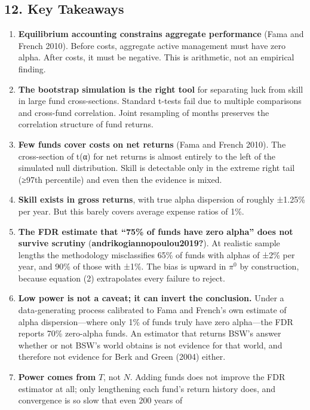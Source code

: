 \documentclass[
  letterpaper,
  DIV=11,
  numbers=noendperiod]{scrartcl}
\begin{document}
\subsection{12. Key Takeaways}\label{key-takeaways}

\begin{enumerate}
\def\labelenumi{\arabic{enumi}.}
\item
  \textbf{Equilibrium accounting constrains aggregate performance} (Fama
  and French 2010). Before costs, aggregate active management must have
  zero alpha. After costs, it must be negative. This is arithmetic, not
  an empirical finding.
\item
  \textbf{The bootstrap simulation is the right tool} for separating
  luck from skill in large fund cross-sections. Standard t-tests fail
  due to multiple comparisons and cross-fund correlation. Joint
  resampling of months preserves the correlation structure of fund
  returns.
\item
  \textbf{Few funds cover costs on net returns} (Fama and French 2010).
  The cross-section of t(α) for net returns is almost entirely to the
  left of the simulated null distribution. Skill is detectable only in
  the extreme right tail (≥97th percentile) and even then the evidence
  is mixed.
\item
  \textbf{Skill exists in gross returns}, with true alpha dispersion of
  roughly ±1.25\% per year. But this barely covers average expense
  ratios of 1\%.
\item
  \textbf{The FDR estimate that ``75\% of funds have zero alpha'' does
  not survive scrutiny} (\textbf{andrikogiannopoulou2019?}). At
  realistic sample lengths the methodology misclassifies 65\% of funds
  with alphas of ±2\% per year, and 90\% of those with ±1\%. The bias is
  upward in \(\pi^0\) by construction, because equation (2) extrapolates
  every failure to reject.
\item
  \textbf{Low power is not a caveat; it can invert the conclusion.}
  Under a data-generating process calibrated to Fama and French's own
  estimate of alpha dispersion---where only 1\% of funds truly have zero
  alpha---the FDR reports 70\% zero-alpha funds. An estimator that
  returns BSW's answer whether or not BSW's world obtains is not
  evidence for that world, and therefore not evidence for Berk and Green
  (2004) either.
\item
  \textbf{Power comes from} \(T\), not \(N\). Adding funds does not
  improve the FDR estimator at all; only lengthening each fund's return
  history does, and convergence is so slow that even 200 years of

\end{enumerate}
\end{document}
